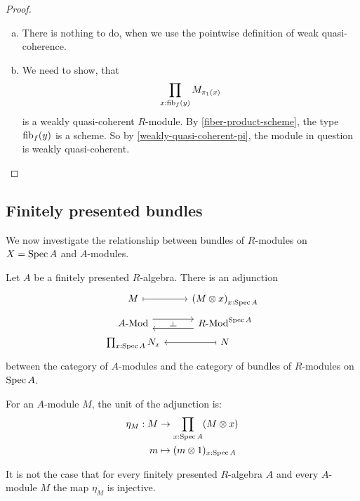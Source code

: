 \begin{proof}
  \begin{enumerate}[(a)]
  \item There is nothing to do, when we use the pointwise definition of weak quasi-coherence. 
  \item We need to show, that
    \[
      \prod_{x:\mathrm{fib}_f(y)}M_{\pi_1(x)}
    \]
    is a weakly quasi-coherent $R$-module.
    By \cref{fiber-product-scheme},
    the type $\mathrm{fib}_f(y)$ is a scheme.
    So by \cref{weakly-quasi-coherent-pi},
    the module in question is weakly quasi-coherent.
  \end{enumerate}
\end{proof}

\subsection{Finitely presented bundles}

We now investigate the relationship between bundles of $R$-modules on $X = \operatorname{Spec} A$
and $A$-modules.

\begin{proposition}
  Let $A$ be a finitely presented $R$-algebra.
  There is an adjunction
  \[ \begin{tikzcd}[row sep=tiny]
    M \ar[r, mapsto] & {(M \otimes x)}_{x : \Spec A} \\
    \Mod{A} \ar[r, shift left=2] \ar[r, phantom, "\rotatebox{90}{$\vdash$}"] &
    \Mod{R}^{\Spec A} \ar[l, shift left=2] \\
    \prod_{x : \Spec A} N_x & N \ar[l, mapsto]
  \end{tikzcd} \]
  between the category of $A$-modules
  and the category of bundles of $R$-modules on $\operatorname{Spec} A$.
\end{proposition}

For an $A$-module $M$,
the unit of the adjunction is:
\begin{align*}
  \eta_M : M &\to \prod_{x : \operatorname{Spec} A} (M \otimes x) \\
  m &\mapsto (m \otimes 1)_{x : \operatorname{Spec} A}
\end{align*}

\begin{example}
  It is not the case that
  for every finitely presented $R$-algebra $A$
  and every $A$-module $M$
  the map $\eta_M$ is injective.
\end{example}


